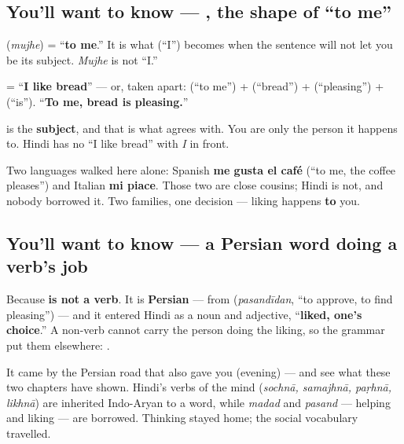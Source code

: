\subsection*{You'll want to know — , the shape of \textquotedblleft{}to me\textquotedblright{}}
\textbf{} (\emph{mujhe}) = \textquotedblleft{}\textbf{to me}.\textquotedblright{} It is what \textbf{} (\textquotedblleft{}I\textquotedblright{}) becomes when the sentence will not let you be its subject. \emph{Mujhe} is not \textquotedblleft{}I.\textquotedblright{}

\begin{grammarlens}[title={Grammar Lens: the thing you like is the subject}]
\textbf{   } = \textquotedblleft{}\textbf{I like bread}\textquotedblright{} — or, taken apart: \textbf{} (\textquotedblleft{}to me\textquotedblright{}) + \textbf{} (\textquotedblleft{}bread\textquotedblright{}) + \textbf{} (\textquotedblleft{}pleasing\textquotedblright{}) + \textbf{} (\textquotedblleft{}is\textquotedblright{}). \textquotedblleft{}\textbf{To me, bread is pleasing.}\textquotedblright{}

\textbf{} is the \textbf{subject}, and that is what \textbf{} agrees with. You are only the person it happens to. Hindi has no \textquotedblleft{}I like bread\textquotedblright{} with \emph{I} in front.

Two languages walked here alone: Spanish \textbf{me gusta el café} (\textquotedblleft{}to me, the coffee pleases\textquotedblright{}) and Italian \textbf{mi piace}. Those two are close cousins; Hindi is not, and nobody borrowed it. Two families, one decision — liking happens \textbf{to} you.
\end{grammarlens}

\subsection*{You'll want to know — a Persian word doing a verb's job}
Because \textbf{ is not a verb}. It is \textbf{Persian} — from \textbf{} (\emph{pasandīdan}, \textquotedblleft{}to approve, to find pleasing\textquotedblright{}) — and it entered Hindi as a noun and adjective, \textquotedblleft{}\textbf{liked, one's choice}.\textquotedblright{} A non-verb cannot carry the person doing the liking, so the grammar put them elsewhere: \textbf{}.

It came by the Persian road that also gave you \textbf{} (evening) — and see what these two chapters have shown. Hindi's verbs of the mind (\emph{sochnā, samajhnā, paṛhnā, likhnā}) are inherited Indo-Aryan to a word, while \emph{madad} and \emph{pasand} — helping and liking — are borrowed. Thinking stayed home; the social vocabulary travelled.

